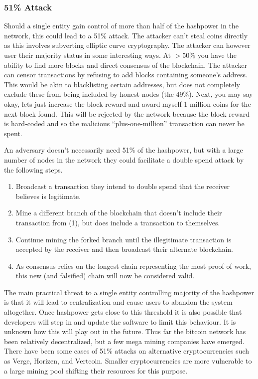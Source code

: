 \subsubsection*{51\% Attack}\label{Se:51}
Should a single entity gain control of more than half of the hashpower in the network, this could lead to a 51\% attack. The attacker can't steal coins directly as this involves subverting elliptic curve cryptography. The attacker can however user their majority status in some interesting ways. At $>50\%$ you have the ability to find more blocks and direct consensus of the blockchain. The attacker can censor transactions by refusing to add blocks containing someone's address. This would be akin to blacklisting certain addresses, but does not completely exclude these from being included by honest nodes (the 49\%). Next, you may say okay, lets just increase the block reward and award myself 1 million coins for the next block found. This will be rejected by the network because the block reward is hard-coded and so the malicious ``plus-one-million'' transaction can never be spent. 

An adversary doesn't necessarily need 51\% of the hashpower, but with a large number of nodes in the network they could facilitate a double spend attack by the following steps.
\begin{enumerate}
	\item Broadcast a transaction they intend to double spend that the receiver believes is legitimate.
	\item Mine a different branch of the blockchain that doesn't include their transaction from (1), but does include a transaction to themselves.
	\item Continue mining the forked branch until the illegitimate transaction is accepted by the receiver and then broadcast their alternate blockchain.
	\item As consensus relies on the longest chain representing the most proof of work, this new (and falsified) chain will now be considered valid.
\end{enumerate}

The main practical threat to a single entity controlling majority of the hashpower is that it will lead to centralization and cause users to abandon the system altogether. Once hashpower gets close to this threshold it is also possible that developers will step in and update the software to limit this behaviour. It is unknown how this will play out in the future. Thus far the bitcoin network has been relatively decentralized, but a few mega mining companies have emerged. There have been some cases of 51\% attacks on alternative cryptocurrencies such as Verge, Horizen, and Vertcoin. Smaller cryptocurrencies are more vulnerable to a large mining pool shifting their resources for this purpose.

